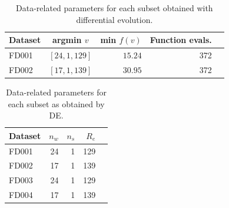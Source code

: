 \documentclass[12pt]{IEEEtran}%
\begin{document}
\begin{table}
\begin{center}
\caption{Data-related parameters for each subset obtained with differential evolution.}%
%
\begin{tabular}
[c]{l|crrl}\hline
Dataset & argmin $v$ & min $f(v)$ & Function evals. & \\\hline\hline
FD001 & $\left[  24, 1, 129 \right]  $ & $15.24$ & 372 & \\
FD002 & $\left[  17, 1, 139 \right]  $ & $30.95$ & 372 & \\\hline
\end{tabular}
\label{table:optimal_data_params}%
\end{center}
\end{table}


\begin{table}
\begin{center}
\caption{Data-related parameters for each subset as obtained by DE.}%
%
\begin{tabular}
[c]{lrrrl}\hline
Dataset & $n_{w}$ & $n_{s}$ & $R_{e}$ & \\\hline\hline
FD001 & 24 & 1 & 129 & \\
FD002 & 17 & 1 & 139 & \\
FD003 & 24 & 1 & 129 & \\
FD004 & 17 & 1 & 139 & \\\hline
\end{tabular}
\label{table:data_params_de}%
\end{center}
\end{table}
\end{document}
